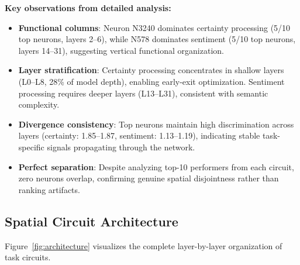 \documentclass{article}
\begin{document}
\textbf{Key observations from detailed analysis:}
\begin{itemize}
    \item \textbf{Functional columns}: Neuron N3240 dominates certainty processing (5/10 top neurons, layers 2--6), while N578 dominates sentiment (5/10 top neurons, layers 14--31), suggesting vertical functional organization.
    
    \item \textbf{Layer stratification}: Certainty processing concentrates in shallow layers (L0--L8, 28\% of model depth), enabling early-exit optimization. Sentiment processing requires deeper layers (L13--L31), consistent with semantic complexity.
    
    \item \textbf{Divergence consistency}: Top neurons maintain high discrimination across layers (certainty: 1.85--1.87, sentiment: 1.13--1.19), indicating stable task-specific signals propagating through the network.
    
    \item \textbf{Perfect separation}: Despite analyzing top-10 performers from each circuit, zero neurons overlap, confirming genuine spatial disjointness rather than ranking artifacts.
\end{itemize}

\subsection{Spatial Circuit Architecture}

Figure~\ref{fig:architecture} visualizes the complete layer-by-layer organization of task circuits.
\end{document}
